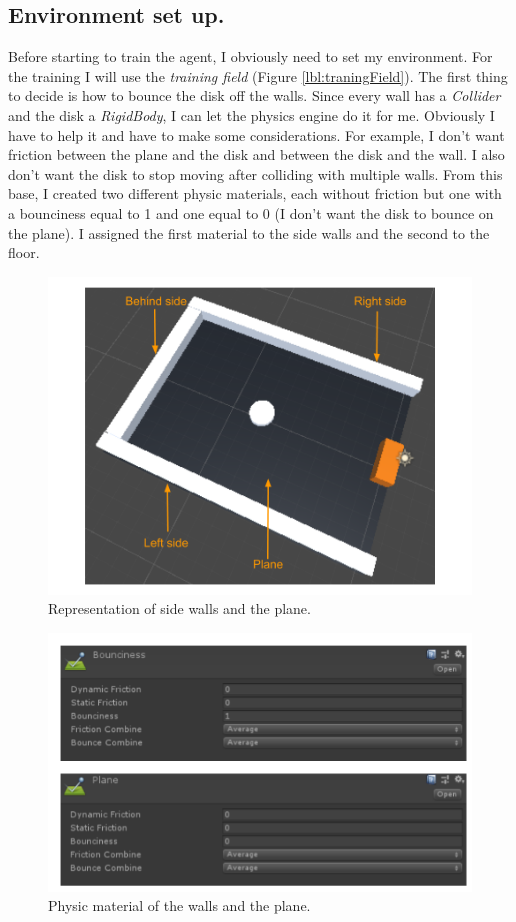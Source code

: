 \documentclass[12pt]{article}
\begin{document}
	\subsection{Environment set up.}
	Before starting to train the agent, I obviously need to set my environment. For the training I will use the \textit{training field} (Figure \ref{lbl:traningField}). The first thing to decide is how to bounce the disk off the walls. Since every wall has a \textit{Collider} and the disk a \textit{RigidBody}, I can let the physics engine do it for me. Obviously I have to help it and have to make some considerations. For example, I don't want friction between the plane and the disk and between the disk and the wall.
	I also don't want the disk to stop moving after colliding with multiple walls.
	From this base, I created two different physic materials, each without friction but one with a bounciness equal to 1 and one equal to 0 (I don't want the disk to bounce on the plane). I assigned the first material to the side walls and the second to the floor.
	
	\begin{figure}[hbt!]
		\centering
		\includegraphics[width= 0.73
		\textwidth]{images/SidePlane.png}
		\caption{Representation of side walls and the plane.}
		\label{lbl:SidePlane}
	\end{figure} 
	
	\newpage
	
	\begin{figure}[hbt!]
		\centering
		\includegraphics[width= 1
		\textwidth]{images/PM.png}
		\caption{Physic material of the walls and the plane.}
	\end{figure} 
\end{document}
